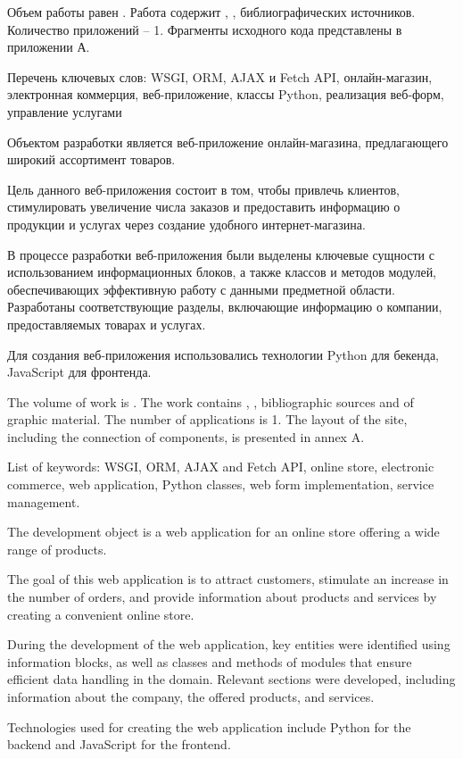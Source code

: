 
Объем работы равен . Работа содержит , ,  библиографических источников. Количество приложений – 1. Фрагменты исходного кода представлены в приложении А. 

Перечень ключевых слов: WSGI, ORM, AJAX и Fetch API, онлайн-магазин, электронная коммерция, веб-приложение, классы Python, реализация веб-форм, управление услугами

Объектом разработки является веб-приложение онлайн-магазина, предлагающего широкий ассортимент товаров.

Цель данного веб-приложения состоит в том, чтобы привлечь клиентов, стимулировать увеличение числа заказов и предоставить информацию о продукции и услугах через создание удобного интернет-магазина.

В процессе разработки веб-приложения были выделены ключевые сущности с использованием информационных блоков, а также классов и методов модулей, обеспечивающих эффективную работу с данными предметной области. Разработаны соответствующие разделы, включающие информацию о компании, предоставляемых товарах и услугах.

Для создания веб-приложения использовались технологии Python для бекенда, JavaScript для фронтенда.


  
The volume of work is . The work contains , ,  bibliographic sources and  of graphic material. The number of applications is 1. The layout of the site, including the connection of components, is presented in annex A.


List of keywords: WSGI, ORM, AJAX and Fetch API, online store, electronic commerce, web application, Python classes, web form implementation, service management.

The development object is a web application for an online store offering a wide range of products.

The goal of this web application is to attract customers, stimulate an increase in the number of orders, and provide information about products and services by creating a convenient online store.

During the development of the web application, key entities were identified using information blocks, as well as classes and methods of modules that ensure efficient data handling in the domain. Relevant sections were developed, including information about the company, the offered products, and services.

Technologies used for creating the web application include Python for the backend and JavaScript for the frontend.

